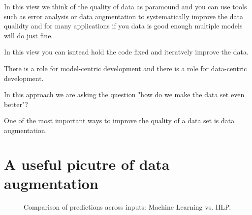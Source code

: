 In this view we think of the quality of data as paramound and you can use tools such as error analysis or data augmentation to systematically improve the data qualidty and for many applications if you data is good enough multiple models will do just fine.

In this view you can isntead hold the code fixed and iteratvely improve the data.

There is a role for model-centric development and there is a role for data-centric development.

In this approach we are asking the question "how do we make the data set even better"?

One of the most important ways to improve the quality of a data set is data augmentation.

\section{A useful picutre of data augmentation}

\begin{figure}[h!]
    \centering
    \caption{Comparison of predictions across inputs: Machine Learning vs. HLP.}
    \label{fig:predictions-curve}
\end{figure}

